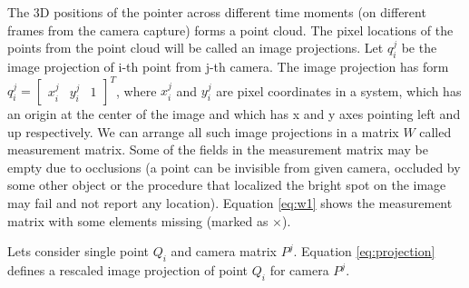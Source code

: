\documentclass[12pt]{article}
\begin{document}
The 3D positions of the pointer across different time moments (on different frames
from the camera  capture) forms a point cloud. The pixel locations of the points
from the point cloud will be  called an image projections. Let $q_i^j$ be the
image projection of i-th point from j-th  camera. The image projection has form
$q_i^j = \begin{bmatrix} x_i^j & y_i^j & 1 \end{bmatrix}^T$, where $x_i^j$ and
$y_i^j$ are  pixel coordinates in a system, which has an origin at the center of
the image and which has x   and y axes pointing left and up respectively. We can
arrange all such image projections in a   matrix $W$ called measurement matrix.
Some of the fields in the measurement matrix may be   empty due to occlusions (a
point can be invisible from given camera, occluded by some other   object or the
procedure that localized the bright spot on the image may fail and not report
any location). Equation \ref{eq:w1} shows the measurement matrix with some
elements missing   (marked as $\times$).


Lets consider single point $Q_i$ and camera matrix $P^j$. Equation
\ref{eq:projection} defines a rescaled image projection of point $Q_i$ for
camera $P^j$.
\end{document}

